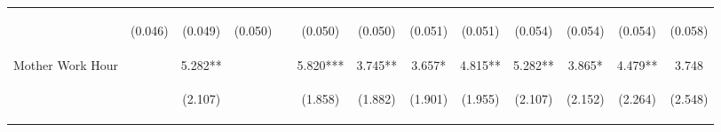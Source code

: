 \begin{tabular}{lcccccccccccc}
 & \begin{footnotesize}(0.046)\end{footnotesize} & \begin{footnotesize}(0.049)\end{footnotesize} & \begin{footnotesize}(0.050)\end{footnotesize} & \begin{footnotesize}\end{footnotesize} & \begin{footnotesize}(0.050)\end{footnotesize} & \begin{footnotesize}(0.050)\end{footnotesize} & \begin{footnotesize}(0.051)\end{footnotesize} & \begin{footnotesize}(0.051)\end{footnotesize} & \begin{footnotesize}(0.054)\end{footnotesize} & \begin{footnotesize}(0.054)\end{footnotesize} & \begin{footnotesize}(0.054)\end{footnotesize} & \begin{footnotesize}(0.058)\end{footnotesize}\\
\noalign{\smallskip}Mother Work Hour &  & 5.282** &  &  & 5.820*** & 3.745** & 3.657* & 4.815** & 5.282** & 3.865* & 4.479** & 3.748\\
 & \begin{footnotesize}\end{footnotesize} & \begin{footnotesize}(2.107)\end{footnotesize} & \begin{footnotesize}\end{footnotesize} & \begin{footnotesize}\end{footnotesize} & \begin{footnotesize}(1.858)\end{footnotesize} & \begin{footnotesize}(1.882)\end{footnotesize} & \begin{footnotesize}(1.901)\end{footnotesize} & \begin{footnotesize}(1.955)\end{footnotesize} & \begin{footnotesize}(2.107)\end{footnotesize} & \begin{footnotesize}(2.152)\end{footnotesize} & \begin{footnotesize}(2.264)\end{footnotesize} & \begin{footnotesize}(2.548)\end{footnotesize}\\

\end{tabular}
